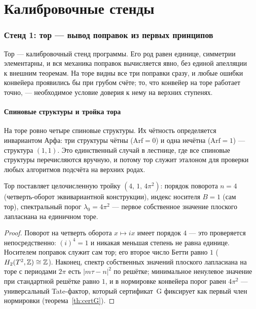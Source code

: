 \part{Калибровочные стенды}

\section{Стенд 1: тор — вывод поправок из первых принципов}\label{sec:torus}

Тор — калибровочный стенд программы. Его род равен единице, симметрии
элементарны, и вся механика поправок вычисляется явно, без единой
апелляции к внешним теоремам. На торе видны все три поправки сразу,
и любые ошибки конвейера проявились бы при грубом счёте; то, что
конвейер на торе работает точно, — необходимое условие доверия к нему
на верхних ступенях.

\subsection{Спиновые структуры и тройка тора}

На торе ровно четыре спиновые структуры. Их чётность определяется
инвариантом Арфа: три структуры чётны ($\mathrm{Arf}=0$) и одна
нечётна ($\mathrm{Arf}=1$) — структура $(1,1)$. Это единственный
случай в лестнице, где все спиновые структуры перечисляются вручную,
и потому тор служит эталоном для проверки любых алгоритмов подсчёта
на верхних родах.

\begin{lemma}\label{lem:torus-triple}
Тор поставляет целочисленную тройку $(4,\,1,\,4\pi^2)$: порядок поворота
$n=4$ (четверть-оборот эквивариантной конструкции), индекс носителя
$B=1$ (сам тор), спектральный порог $\lambda_0=4\pi^2$ — первое
собственное значение плоского лапласиана на единичном торе.
\end{lemma}

\begin{proof}
Поворот на четверть оборота $x\mapsto ix$ имеет порядок $4$ — это
проверяется непосредственно: $(i)^4=1$ и никакая меньшая степень не
равна единице. Носителем поправок служит сам тор; его второе число
Бетти равно $1$ ($H_2(T^2,\mathbb{Z})\cong\mathbb{Z}$). Наконец, спектр собственных
значений плоского лапласиана на торе с периодами $2\pi$ есть
$|m\tau-n|^2$ по решётке; минимальное ненулевое значение при
стандартной решётке равно $1$, и в нормировке конвейера порог равен
$4\pi^2$ — универсальный Tate-фактор, который сертификат~G фиксирует
как первый член нормировки (теорема~\ref{th:certG}).
\end{proof}

